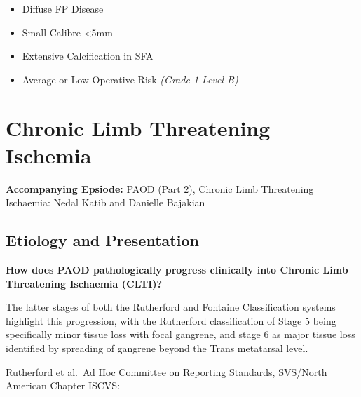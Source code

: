 \documentclass[
]{book}
\begin{document}
\begin{itemize}
\begin{itemize}
\begin{itemize}
      \begin{itemize}
      \item
        Diffuse FP Disease
      \item
        Small Calibre \textless5mm
      \item
        Extensive Calcification in SFA
      \item
        Average or Low Operative Risk \emph{(Grade 1 Level B)}
      \end{itemize}
    \end{itemize}
  \end{itemize}
\end{itemize}

\hypertarget{chronic-limb-threatening-ischemia-1}{%
\section{Chronic Limb Threatening Ischemia}\label{chronic-limb-threatening-ischemia-1}}

\textbf{Accompanying Epsiode:}
PAOD (Part 2), Chronic Limb Threatening Ischaemia: Nedal Katib and Danielle Bajakian

\hypertarget{etiology-and-presentation}{%
\subsection{Etiology and Presentation}\label{etiology-and-presentation}}

\textbf{How does PAOD pathologically progress clinically into Chronic Limb Threatening
Ischaemia (CLTI)? }

The latter stages of both the Rutherford and Fontaine Classification
systems highlight this progression, with the Rutherford classification
of Stage 5 being specifically minor tissue loss with focal gangrene, and
stage 6 as major tissue loss identified by spreading of gangrene beyond
the Trans metatarsal level.

Rutherford et al.~Ad Hoc Committee on Reporting Standards, SVS/North
American Chapter ISCVS:
\end{document}
